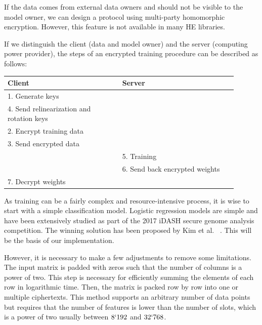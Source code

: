 \documentclass[a4paper,11pt,oneside]{report}
\begin{document}
If the data comes from external data owners and should not be visible to the model owner, we can design a protocol using multi-party homomorphic encryption. 
However, this feature is not available in many HE libraries.

If we distinguish the client (data and model owner) and the server (computing power provider), the steps of an encrypted training procedure can be described as follows:

\begin{table}[h!]
  \begin{center}
    \begin{tabular}{ p{0.45\linewidth} | p{0.45\linewidth} }
    \hline
    Client & Server \\
    \hline
    1. Generate keys &  \\
    4. Send relinearization and rotation keys &  \\
    2. Encrypt training data &  \\
    3. Send encrypted data & \\
     & 5. Training \\
     & 6. Send back encrypted weights \\
    7. Decrypt weights &  \\
    \hline
    \end{tabular}
  \end{center}
\end{table}

As training can be a fairly complex and resource-intensive process, it is wise to start with a simple classification model. 
Logistic regression models are simple and have been extensively studied as part of the 2017 iDASH secure genome analysis competition. 
The winning solution has been proposed by Kim et al. ~\cite{kim_logistic_2018}. 
This will be the basis of our implementation.

However, it is necessary to make a few adjustments to remove some limitations. 
The input matrix is padded with zeros such that the number of columns is a power of two. 
This step is necessary for efficiently summing the elements of each row in logarithmic time. 
Then, the matrix is packed row by row into one or multiple ciphertexts. 
This method supports an arbitrary number of data points but requires that the number of features is lower than the number of slots, which is a power of two usually between $8`192$ and $32`768$. 
\end{document}
